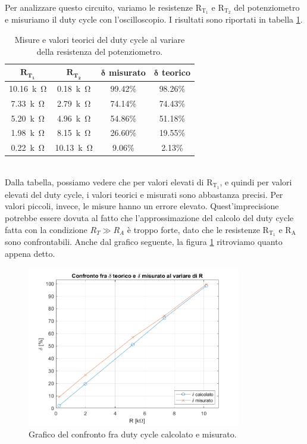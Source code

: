 \documentclass{report}
\begin{document}
\\ Per analizzare questo circuito, variamo le resistenze $\mathrm{R_{T_1}}$ e $\mathrm{R_{T_2}}$ del potenziometro e misuriamo il duty cycle con l'oscilloscopio. I risultati sono riportati in tabella \ref{table:mis_cto4}.
\begin{table}[h!]
	\centering
	\begin{tabular}{|c|c|c|c|}
		\hline
		$\mathbf{R_{T_1}}$ & $\mathbf{R_{T_2}}$ & $\mathbf\delta$\textbf{ misurato} & $\mathbf\delta$\textbf{ teorico}\\ 
		\hline
		\SI{10.16}{k\ohm} & \SI{0.18}{k\ohm} & 99.42\% & 98.26\% \\ 
		\hline
		\SI{7.33}{k\ohm} & \SI{2.79}{k\ohm} & 74.14\% & 74.43\% \\ 
		\hline
		\SI{5.20}{k\ohm} & \SI{4.96}{k\ohm} & 54.86\% & 51.18\% \\ 
		\hline
		\SI{1.98}{k\ohm} & \SI{8.15}{k\ohm} & 26.60\% & 19.55\% \\ 
		\hline
		\SI{0.22}{k\ohm} & \SI{10.13}{k\ohm} & 9.06\% & 2.13\% \\ 
		\hline
	\end{tabular}
	\caption{Misure e valori teorici del duty cycle al variare della resistenza del potenziometro.}
	\label{table:mis_cto4}
\end{table}
\\Dalla tabella, possiamo vedere che per valori elevati di $\mathrm{R_{T_1}}$, e quindi per valori elevati del duty cycle, i valori teorici e misurati sono abbastanza precisi. Per valori piccoli, invece, le misure hanno un errore elevato. Quest'imprecisione potrebbe essere dovuta al fatto che l'approssimazione del calcolo del duty cycle fatta con la condizione $\displaystyle{R_{T}\gg R_A}$ è troppo forte, dato che le resistenze $\mathrm{R_{T_1}}$ e $\mathrm{R_{A}}$ sono confrontabili. Anche dal grafico seguente, la figura \ref{figura:grafico4} ritroviamo quanto appena detto.
\begin{figure}[h!]
	\centering
	\includegraphics[height=7cm]{immagini/graficomis4}
	\caption{Grafico del confronto fra duty cycle calcolato e misurato.}
	\label{figura:grafico4}
\end{figure}
\end{document}
